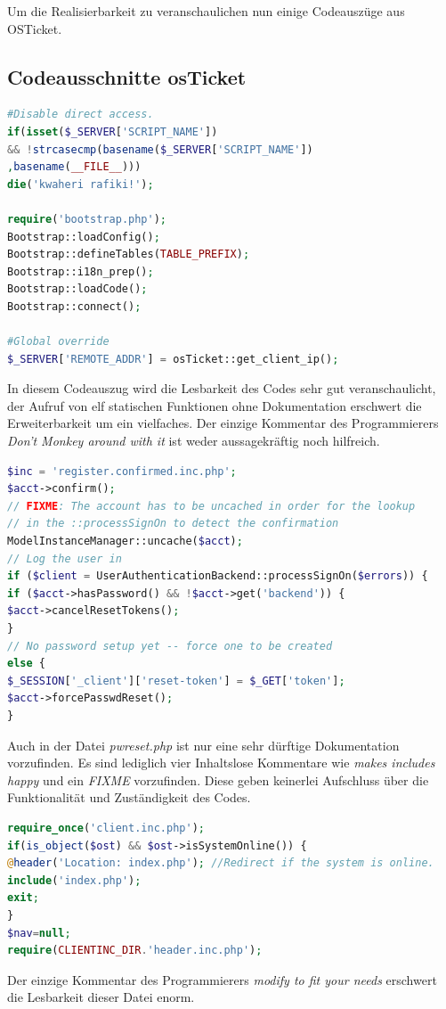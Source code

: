 Um die Realisierbarkeit zu veranschaulichen nun einige Codeauszüge aus OSTicket.
\newpage
\subsection{Codeausschnitte osTicket}
\begin{lstlisting}[language=PHP, caption=main.inc.php, firstnumber=18]
#Disable direct access.
if(isset($_SERVER['SCRIPT_NAME'])
&& !strcasecmp(basename($_SERVER['SCRIPT_NAME'])
,basename(__FILE__)))
die('kwaheri rafiki!');

require('bootstrap.php');
Bootstrap::loadConfig();
Bootstrap::defineTables(TABLE_PREFIX);
Bootstrap::i18n_prep();
Bootstrap::loadCode();
Bootstrap::connect();

#Global override
$_SERVER['REMOTE_ADDR'] = osTicket::get_client_ip();

\end{lstlisting}


In diesem Codeauszug wird die Lesbarkeit des Codes sehr gut veranschaulicht, der Aufruf von elf statischen Funktionen ohne Dokumentation erschwert die Erweiterbarkeit um ein vielfaches. Der einzige Kommentar des Programmierers \textit{Don't Monkey around with it} ist weder aussagekräftig noch hilfreich.
\newpage
\begin{lstlisting}[language=PHP, caption=pwreset.php, firstnumber=51]
$inc = 'register.confirmed.inc.php';
$acct->confirm();
// FIXME: The account has to be uncached in order for the lookup
// in the ::processSignOn to detect the confirmation
ModelInstanceManager::uncache($acct);
// Log the user in
if ($client = UserAuthenticationBackend::processSignOn($errors)) {
if ($acct->hasPassword() && !$acct->get('backend')) {
$acct->cancelResetTokens();
}
// No password setup yet -- force one to be created
else {
$_SESSION['_client']['reset-token'] = $_GET['token'];
$acct->forcePasswdReset();
}
\end{lstlisting}

Auch in der Datei \textit{pwreset.php} ist nur eine sehr dürftige Dokumentation vorzufinden. Es sind lediglich vier Inhaltslose Kommentare wie \textit{makes includes happy} und ein \textit{FIXME} vorzufinden. Diese geben keinerlei Aufschluss über die Funktionalität und Zuständigkeit des Codes.
\newpage
\begin{lstlisting}[language=PHP, caption=offline.php, firstnumber=16]
require_once('client.inc.php');
if(is_object($ost) && $ost->isSystemOnline()) {
@header('Location: index.php'); //Redirect if the system is online.
include('index.php');
exit;
}
$nav=null;
require(CLIENTINC_DIR.'header.inc.php');
\end{lstlisting}
Der einzige Kommentar des Programmierers \textit{modify to fit your needs} erschwert die Lesbarkeit dieser Datei enorm.


